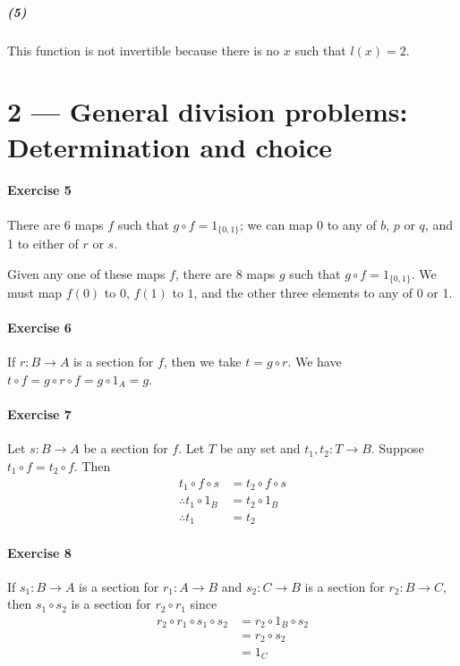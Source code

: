 \documentclass{report}
\begin{document}
    \subparagraph{(5)}
    This function is not invertible because there is no $x$ such that $l(x) = 2$.

    \section{2 --- General division problems: Determination and choice}

    \paragraph{Exercise 5}
    There are 6 maps $f$ such that $g \circ f = 1_{\{0,1\}}$; we can map 0 to any of $b$, $p$ or $q$,
    and 1 to either of $r$ or $s$.

    Given any one of these maps $f$, there are 8 maps $g$ such that $g \circ f = 1_{\{0,1\}}$.
    We must map $f(0)$ to $0$, $f(1)$ to $1$, and the other three elements to any of 0 or 1.

    \paragraph{Exercise 6}
    If $r : B \rightarrow A$ is a section for $f$, then we take $t = g \circ r$. We have
    $t \circ f = g \circ r \circ f = g \circ 1_A = g$.

    \paragraph{Exercise 7}
    Let $s : B \rightarrow A$ be a section for $f$. Let $T$ be any set and $t_1, t_2 : T \rightarrow B$.
    Suppose $t_1 \circ f = t_2 \circ f$. Then
    \begin{align*}
        t_1 \circ f \circ s & = t_2 \circ f \circ s \\
        \therefore t_1 \circ 1_B & = t_2 \circ 1_B \\
        \therefore t_1 & = t_2
    \end{align*}

    \paragraph{Exercise 8}
    If $s_1 : B \rightarrow A$ is a section for $r_1 : A \rightarrow B$ and $s_2 : C \rightarrow B$
    is a section for $r_2 : B \rightarrow C$, then $s_1 \circ s_2$ is a section for $r_2 \circ r_1$ since
    \begin{align*}
        r_2 \circ r_1 \circ s_1 \circ s_2 & = r_2 \circ 1_B \circ s_2 \\
        & = r_2 \circ s_2 \\
        & = 1_C
    \end{align*}
\end{document}
